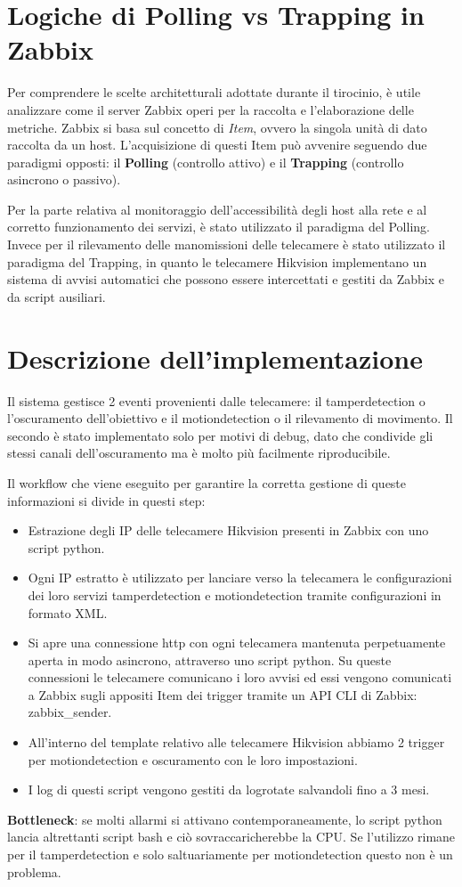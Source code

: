 \documentclass[12pt, a4paper, oneside]{report}
\begin{document}
\section{Logiche di Polling vs Trapping in Zabbix}

Per comprendere le scelte architetturali adottate durante il tirocinio, è utile analizzare come il server Zabbix operi per la raccolta e l'elaborazione delle metriche. Zabbix si basa sul concetto di \textit{Item}, ovvero la singola unità di dato raccolta da un host. L'acquisizione di questi Item può avvenire seguendo due paradigmi opposti: il \textbf{Polling} (controllo attivo) e il \textbf{Trapping} (controllo asincrono o passivo).

Per la parte relativa al monitoraggio dell'accessibilità degli host alla rete e al corretto funzionamento dei servizi, è stato utilizzato il paradigma del Polling. Invece per il rilevamento delle manomissioni delle telecamere è stato utilizzato il paradigma del Trapping, in quanto le telecamere Hikvision implementano un sistema di avvisi automatici che possono essere intercettati e gestiti da Zabbix e da script ausiliari.
\section{Descrizione dell'implementazione}
Il sistema gestisce 2 eventi provenienti dalle telecamere: il  tamperdetection o l'oscuramento dell'obiettivo e il motiondetection o il rilevamento di movimento.
Il secondo è stato implementato solo per motivi di debug, dato che condivide gli stessi canali dell'oscuramento ma è molto più facilmente riproducibile.

Il workflow che viene eseguito per garantire la corretta gestione di queste informazioni si divide in questi step:
\begin{itemize}
    \item Estrazione degli IP delle telecamere Hikvision presenti in Zabbix con uno script python.
    \item Ogni IP estratto è utilizzato per lanciare verso la telecamera le configurazioni dei loro servizi tamperdetection e motiondetection tramite configurazioni in formato XML.
    \item Si apre una connessione http con ogni telecamera mantenuta perpetuamente aperta in modo asincrono, attraverso uno script python. Su queste connessioni le telecamere comunicano i loro avvisi ed essi vengono comunicati a Zabbix sugli appositi Item dei trigger tramite un API CLI di Zabbix: zabbix\_sender.
    \item All'interno del template relativo alle telecamere Hikvision abbiamo 2 trigger per motiondetection e oscuramento con le loro impostazioni.
    \item I log di questi script vengono gestiti da logrotate \parencite{man_logrotate} salvandoli fino a 3 mesi.
\end{itemize}
\textbf{Bottleneck}: se molti allarmi si attivano contemporaneamente,
lo script python lancia altrettanti script bash e ciò sovraccaricherebbe la CPU.
Se l'utilizzo rimane per il tamperdetection e solo saltuariamente per motiondetection questo non è un problema.
\end{document}
